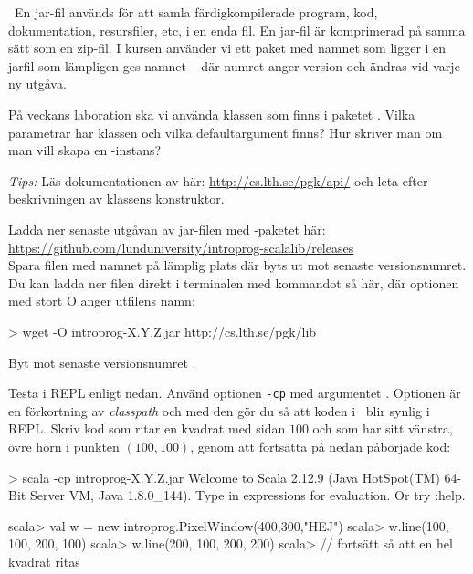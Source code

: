 \QUESTEND




\QUESTBEGIN

\Task \what~En jar-fil används för att samla färdigkompilerade program, kod, dokumentation, resursfiler, etc, i en enda fil. En jar-fil är komprimerad på samma sätt som en zip-fil. I kursen använder vi ett paket med namnet  som ligger i en jarfil som lämpligen ges namnet \LibJar~ där numret anger version och ändras vid varje ny utgåva.

\Subtask På veckans laboration ska vi använda klassen  som finns i paketet . Vilka parametrar har klassen  och vilka defaultargument finns? Hur skriver man om man vill skapa en -instans?

\emph{Tips:}  Läs dokumentationen av  här: \url{http://cs.lth.se/pgk/api/}
och leta efter beskrivningen av klassens konstruktor.

\Subtask Ladda ner senaste utgåvan av jar-filen med -paketet här:
\\\url{https://github.com/lunduniversity/introprog-scalalib/releases}
\\ Spara filen med namnet   på lämplig plats där  byts ut mot senaste versionsnumret. Du kan ladda ner filen direkt i terminalen med kommandot  så här, där optionen  med stort O anger utfilens namn:
\begin{REPLnonum}
> wget -O introprog-X.Y.Z.jar http://cs.lth.se/pgk/lib
\end{REPLnonum}
Byt  mot senaste versionsnumret \LibVersion.

\Subtask Testa  i REPL enligt nedan. Använd optionen \texttt{-cp} med argumentet \LibJar. Optionen  är en förkortning av \emph{classpath} och med den gör du så att koden i \LibJar~blir synlig i REPL.  Skriv kod som ritar en kvadrat med sidan $100$ och som har sitt vänstra, övre hörn i punkten $(100,100)$, genom att fortsätta på nedan påbörjade kod:

\begin{REPL}
> scala -cp introprog-X.Y.Z.jar
Welcome to Scala 2.12.9 (Java HotSpot(TM) 64-Bit Server VM, Java 1.8.0_144).
Type in expressions for evaluation. Or try :help.

scala> val w = new introprog.PixelWindow(400,300,"HEJ")
scala> w.line(100, 100, 200, 100)
scala> w.line(200, 100, 200, 200)
scala> // fortsätt så att en hel kvadrat ritas
\end{REPL}

